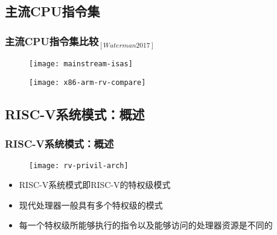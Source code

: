 \subsection{主流CPU指令集}
\begin{frame}
	
	\frametitle{{主流CPU指令集比较$ _{[Waterman 2017]} $}}
	
	\begin{figure}
		\centering
		\texttt{[image: mainstream-isas]}
	\end{figure}
	\pause
	
	\begin{figure}
		\centering
		\texttt{[image: x86-arm-rv-compare]}
	\end{figure}
	
	
	
	
\end{frame}

\subsection{RISC-V系统模式：概述}
\begin{frame}
    \frametitle{RISC-V系统模式：\small{概述}}
    
    \begin{figure}
        \centering
        \texttt{[image: rv-privil-arch]}
    \end{figure}
    
    \begin{itemize}
        
        \item RISC-V系统模式即RISC-V的特权级模式
        \item 现代处理器一般具有多个特权级的模式
        \item 每一个特权级所能够执行的指令以及能够访问的处理器资源是不同的
        
    \end{itemize}
    
\end{frame}

